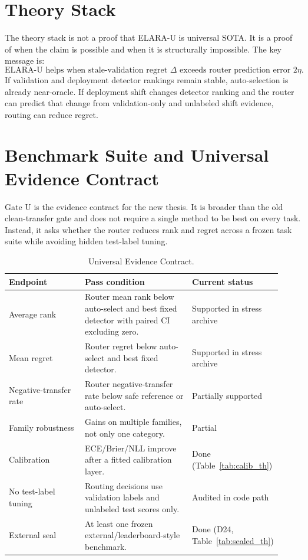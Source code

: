 \documentclass[11pt,titlepage]{article}
\newcommand{\systemu}{ELARA-U}
\newcommand{\gateu}{Gate U}
\begin{document}


\section{Theory Stack}
\label{sec:theory-intro}

The theory stack is not a proof that \systemu{} is universal SOTA. It is a proof
of when the claim is possible and when it is structurally impossible. The key
message is:
\[
\text{ELARA-U helps when stale-validation regret } \Delta \text{ exceeds router prediction error } 2\eta.
\]
If validation and deployment detector rankings remain stable, auto-selection is
already near-oracle. If deployment shift changes detector ranking and the router
can predict that change from validation-only and unlabeled shift evidence, routing
can reduce regret.



\section{Benchmark Suite and Universal Evidence Contract}

\gateu{} is the evidence contract for the new thesis. It is broader than the old
clean-transfer gate and does not require a single method to be best on every
task. Instead, it asks whether the router reduces rank and regret across a
frozen task suite while avoiding hidden test-label tuning.

\begin{table}[H]
\centering
\caption{Universal Evidence Contract.}
\label{tab:contract}
\small
\begin{tabular}{L{0.34\linewidth}L{0.44\linewidth}L{0.14\linewidth}}
\toprule
\textbf{Endpoint} & \textbf{Pass condition} & \textbf{Current status} \\
\midrule
Average rank & Router mean rank below auto-select and best fixed detector with paired CI excluding zero. & Supported in stress archive \\
Mean regret & Router regret below auto-select and best fixed detector. & Supported in stress archive \\
Negative-transfer rate & Router negative-transfer rate below safe reference or auto-select. & Partially supported \\
Family robustness & Gains on multiple families, not only one category. & Partial \\
Calibration & ECE/Brier/NLL improve after a fitted calibration layer. & Done (Table~\ref{tab:calib_th}) \\
No test-label tuning & Routing decisions use validation labels and unlabeled test scores only. & Audited in code path \\
External seal & At least one frozen external/leaderboard-style benchmark. & Done (D24, Table~\ref{tab:sealed_th}) \\
\bottomrule
\end{tabular}
\end{table}
\end{document}
